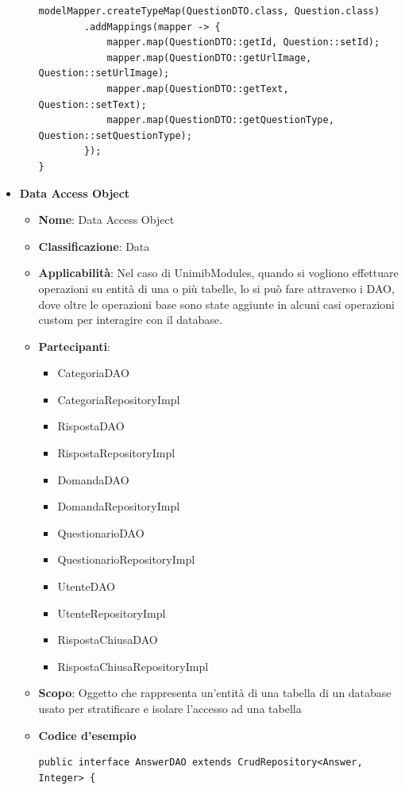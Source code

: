 \documentclass[12pt]{article}
\begin{document}
\begin{itemize}
\begin{itemize}
\begin{lstlisting}
modelMapper.createTypeMap(QuestionDTO.class, Question.class)
		.addMappings(mapper -> {
			mapper.map(QuestionDTO::getId, Question::setId);
			mapper.map(QuestionDTO::getUrlImage, Question::setUrlImage);
			mapper.map(QuestionDTO::getText, Question::setText);
			mapper.map(QuestionDTO::getQuestionType, Question::setQuestionType);
		});
}
            \end{lstlisting}
		\end{itemize}
		
		\item \textbf{Data Access Object}
		\begin{itemize}
		\item \textbf{Nome}: Data Access Object
            \item \textbf{Classificazione}: Data
            \item \textbf{Applicabilità}: Nel caso di UnimibModules, quando si vogliono effettuare operazioni su entità di una o più tabelle, lo si può fare attraverso i DAO, dove oltre le operazioni base sono state aggiunte in alcuni casi operazioni custom per interagire con il database.
            \item \textbf{Partecipanti}:
                \begin{itemize}
                    \item CategoriaDAO
                    \item CategoriaRepositoryImpl
                    \item RispostaDAO
                    \item RispostaRepositoryImpl
                    \item DomandaDAO
                    \item DomandaRepositoryImpl
                    \item QuestionarioDAO
                    \item QuestionarioRepositoryImpl
                    \item UtenteDAO
                    \item UtenteRepositoryImpl
                    \item RispostaChiusaDAO
                    \item RispostaChiusaRepositoryImpl
                \end{itemize}
            \item \textbf{Scopo}: Oggetto che rappresenta un'entità di una tabella di un database usato per stratificare e isolare l'accesso ad una tabella
            \item \textbf{Codice d'esempio}
            \begin{lstlisting}
public interface AnswerDAO extends CrudRepository<Answer, Integer> {


\end{lstlisting}
\end{itemize}
\end{itemize}
\end{document}
